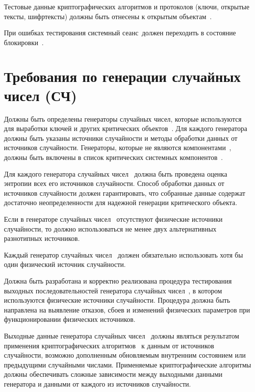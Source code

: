 \label{TestData}
Тестовые данные криптографических алгоритмов и протоколов 
(ключи, открытые тексты, шифртексты) 
должны быть отнесены к открытым объектам~.

\label{TestLock}
При ошибках тестирования системный сеанс~\TOE должен переходить в состояние
блокировки~.

\section{Требования по генерации случайных чисел (СЧ)}

\label{RNG}
Должны быть определены генераторы случайных чисел, 
которые используются для выработки ключей и других критических 
объектов~. 
%
Для каждого генератора должны быть указаны 
источники случайности и методы обработки данных от источников случайности.
%
Генераторы, которые не являются компонентами~\TOE, 
должны быть включены в список 
критических системных компонентов~.

\label{Entropy}
Для каждого генератора случайных чисел~
должна быть проведена оценка энтропии всех его источников случайности. 
Способ обработки данных от источников случайности должен гарантировать, 
что собранные данные содержат достаточно неопределенности 
для надежной генерации критического объекта.

\label{RndSource1}
Если в генераторе случайных чисел~ отсутствуют физические 
источники случайности, то должно использоваться не менее 
двух альтернативных разнотипных источников.

\label{RndSource2}
Каждый генератор случайных чисел~ должен обязательно
использовать хотя бы один физический источник случайности.

\label{RNGTests}
Должна быть разработана и корректно реализована процедура 
тестирования выходных последовательностей генератора 
случайных чисел~,
в котором используются физические источники случайности.
%
Процедура должна быть направлена на выявление 
отказов, сбоев и изменений физических параметров
при функционировании физических источников.

\label{RNGHash}
Выходные данные генератора случайных чисел~
должны являться результатом применения 
криптографических алгоритмов~
к данным от источников случайности, 
возможно дополненным обновляемым внутренним состоянием
или предыдущими случайными числами.
%
Применяемые криптографические алгоритмы должны 
обеспечивать сложные зависимости между выходными данными генератора и 
данными от каждого из источников случайности.
%


